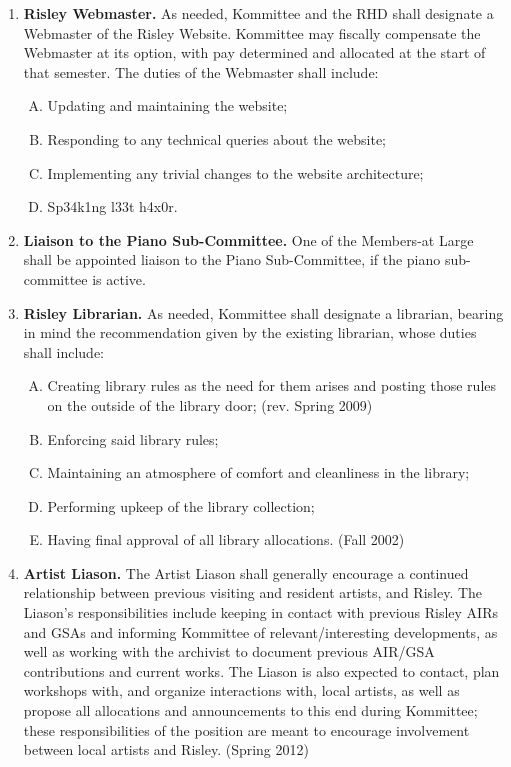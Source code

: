\documentclass[12pt]{article}
\begin{document}
\begin{enumerate}[1.]
\item \textbf{Risley Webmaster.} As needed, Kommittee and the RHD shall designate a Webmaster of the Risley Website. Kommittee may fiscally compensate the Webmaster at its option, with pay determined and allocated at the start of that semester. The duties of the Webmaster shall include:
\begin{enumerate}[A.]
\item Updating and maintaining the website; 
\item Responding to any technical queries about the website; 
\item Implementing any trivial changes to the website architecture; 
\item Sp34k1ng l33t h4x0r.
\end{enumerate}
\item \textbf{Liaison to the Piano Sub-Committee.} One of the Members-at Large shall be appointed liaison to the Piano Sub-Committee, if the piano sub-committee is active.
\item \textbf{Risley Librarian.} As needed, Kommittee shall designate a librarian, bearing in mind the recommendation given by the existing librarian, whose duties shall include: 
\begin{enumerate}[A.] 
\item Creating library rules as the need for them arises and posting those rules on the outside of the library door; (rev. Spring 2009) 
\item Enforcing said library rules;
\item Maintaining an atmosphere of comfort and cleanliness in the library;
\item Performing upkeep of the library collection;
\item Having final approval of all library allocations. (Fall 2002)
\end{enumerate}
\item \textbf{Artist Liason.} The Artist Liason shall generally encourage a continued relationship between previous visiting and resident artists, and Risley. The Liason’s responsibilities include keeping in contact with previous Risley AIRs and GSAs and informing Kommittee of relevant/interesting developments, as well as working with the archivist to document previous AIR/GSA contributions and current works. The Liason is also expected to contact, plan workshops with, and organize interactions with, local artists, as well as propose all allocations and announcements to this end during Kommittee; these responsibilities of the position are meant to encourage involvement between local artists and Risley. (Spring 2012)

\end{enumerate}
\end{document}
